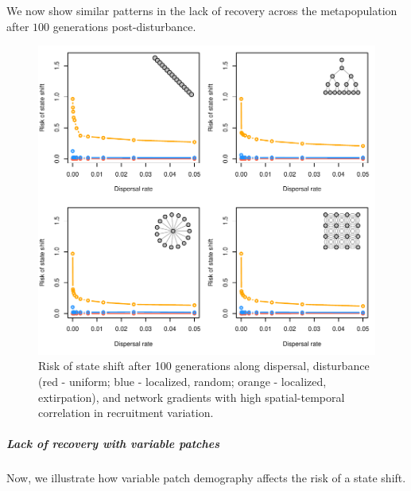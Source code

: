 \documentclass[]{article}
\let\oldsubparagraph\subparagraph
\renewcommand{\subparagraph}[1]{\oldsubparagraph{#1}\mbox{}}
\begin{document}
We now show similar patterns in the lack of recovery across the
metapopulation after \(100\) generations post-disturbance.

\begin{figure}[H]

{\centering \includegraphics{Managing_for_ecological_surprises_in_metapopulations_makeHTML_files/figure-latex/Recovery-1} 

}

\caption{Risk of state shift after 100 generations along dispersal, disturbance (red - uniform; blue - localized, random; orange - localized, extirpation), and network gradients with high spatial-temporal correlation in recruitment variation.}\label{fig:Recovery}
\end{figure}

\hypertarget{lack-of-recovery-with-variable-patches}{%
\subparagraph{Lack of recovery with variable
patches}\label{lack-of-recovery-with-variable-patches}}

Now, we illustrate how variable patch demography affects the risk of a
state shift.
\end{document}
